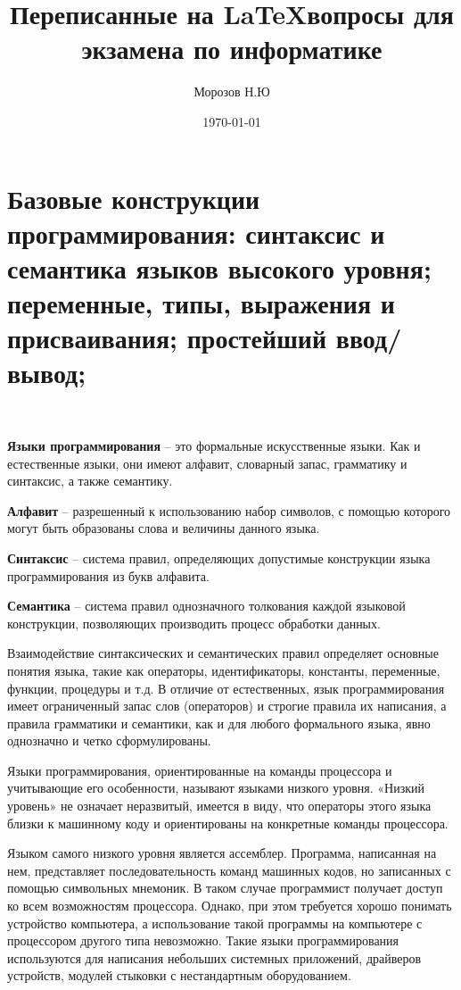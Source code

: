 \documentclass[a4paper, fontsize=10bp]{article} %
\title{Переписанные на \LaTeX вопросы для экзамена по информатике}
\author{Морозов Н.Ю}
\date{\today}
\begin{document}

\maketitle

\newpage

\tableofcontents

\newpage

\singlespacing

\section{Базовые конструкции программирования: синтаксис и семантика языков 
высокого уровня; переменные, типы, выражения и присваивания; простейший ввод/вывод;} 
\ 

{\bfseries Языки программирования} – это формальные искусственные языки. Как и естественные
языки, они имеют алфавит, словарный запас, грамматику и синтаксис, а также семантику.

{\bfseries Алфавит} – разрешенный к использованию набор символов, с помощью которого могут 
быть образованы слова и величины данного языка.

{\bfseries Синтаксис} – система правил, определяющих допустимые конструкции языка 
программирования из букв алфавита.

{\bfseries Семантика} – система правил однозначного толкования каждой языковой конструкции, 
позволяющих производить процесс обработки данных.

Взаимодействие синтаксических и семантических правил определяет основные понятия языка, такие 
как операторы, идентификаторы, константы, переменные, функции, процедуры и т.д. В отличие от 
естественных, язык программирования имеет ограниченный запас слов (операторов) и строгие 
правила их написания, а правила грамматики и семантики, как и для любого формального языка, 
явно однозначно и четко сформулированы.

Языки программирования, ориентированные на команды процессора и учитывающие его особенности, 
называют языками низкого уровня. «Низкий уровень» не означает неразвитый, имеется в виду, что 
операторы этого языка близки к машинному коду и ориентированы на конкретные команды процессора.

Языком самого низкого уровня является ассемблер. Программа, написанная на нем, представляет 
последовательность команд машинных кодов, но записанных с помощью символьных мнемоник. В таком 
случае программист получает доступ ко всем возможностям процессора. Однако, при этом требуется 
хорошо понимать устройство компьютера, а использование такой программы на компьютере с процессором 
другого типа невозможно. Такие языки программирования используются для написания небольших системных 
приложений, драйверов устройств, модулей стыковки с нестандартным оборудованием.
\end{document}
